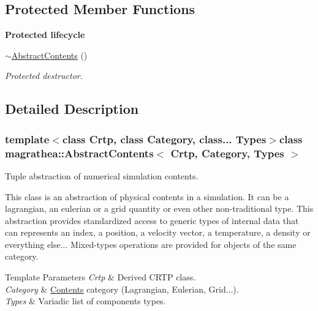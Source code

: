\subsection*{Protected Member Functions}
\begin{Indent}{\bf Protected lifecycle}\par
\begin{DoxyCompactItemize}
\item 
\hyperlink{classmagrathea_1_1AbstractContents_af690b34805dd148df568a14c61c752b9}{$\sim$\-Abstract\-Contents} ()
\begin{DoxyCompactList}\small\item\em Protected destructor. \end{DoxyCompactList}\end{DoxyCompactItemize}
\end{Indent}


\subsection{Detailed Description}
\subsubsection*{template$<$class Crtp, class Category, class... Types$>$class magrathea\-::\-Abstract\-Contents$<$ Crtp, Category, Types $>$}

Tuple abstraction of numerical simulation contents. 

This class is an abstraction of physical contents in a simulation. It can be a lagrangian, an eulerian or a grid quantity or even other non-\/traditional type. This abstraction provides standardized access to generic types of internal data that can represents an index, a position, a velocity vector, a temperature, a density or everything else... Mixed-\/types operations are provided for objects of the same category. 
\begin{DoxyTemplParams}{Template Parameters}
{\em Crtp} & Derived C\-R\-T\-P class. \\
\hline
{\em Category} & \hyperlink{exceptionmagrathea_1_1Contents}{Contents} category (Lagrangian, Eulerian, Grid...). \\
\hline
{\em Types} & Variadic list of components types. \\
\hline
\end{DoxyTemplParams}


